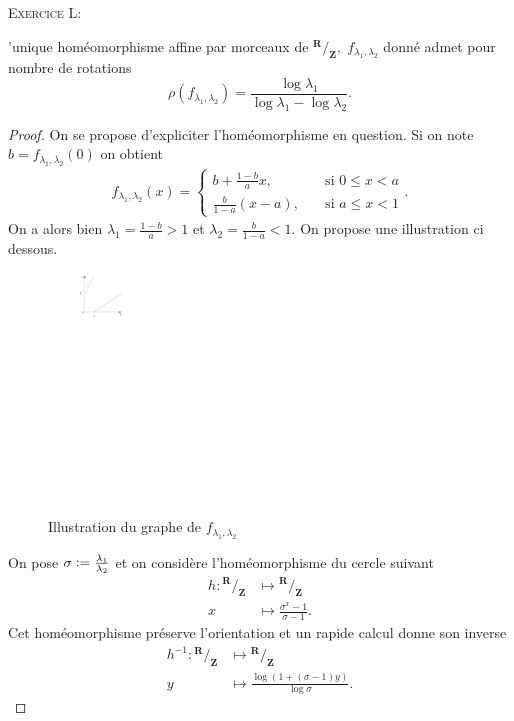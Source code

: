 \documentclass[12pt]{article}
\newcommand{\defeq}{\vcentcolon=}
\newenvironment{ex}[1]
{\begin{mdframed}[linewidth=0.6pt]
        \textsc{Exercice #1:}

}
    {\end{mdframed}}
\newcommand{\R}{\mathbf{R}}
\newcommand{\Z}{\mathbf{Z}}
\newcommand*\quot[2]{{^{\textstyle #1}\big/_{\textstyle #2}}}
\theoremstyle{remark}
\begin{document}
\newpage

\begin{ex}{2}
        L'unique homéomorphisme affine par morceaux de $\quot{\R}{\Z}, \; f_{\lambda_1, \lambda_2}$ donné admet pour nombre de rotations
        \[
                \rho(f_{\lambda_1, \lambda_2}) = \frac{\log\lambda_1} {\log\lambda_1 -\log\lambda_2}
        .\] 
\end{ex}
\begin{proof}
        On se propose d'expliciter l'homéomorphisme en question. Si on note $b = f_{\lambda_1, \lambda_2}(0)$ on obtient 
        \begin{align*}
                f_{\lambda_1, \lambda_2}(x) = \begin{cases}
                        b+ \frac{1-b}{a}x, \quad &\text{si } 0 \le x < a \\
                        \frac{b}{1-a}(x-a), \quad &\text{si } a \le x < 1
                \end{cases}
        .\end{align*}
        On a alors bien $\lambda_1 = \frac{1-b}{a} > 1$ et $\lambda_2 = \frac{b}{1-a} < 1$. On propose une illustration ci dessous. 
        \begin{figure}[htpb]
                \centering
                \includegraphics[width=0.4\textwidth]{homeo.pdf}
                \caption{Illustration du graphe de $f_{\lambda_1, \lambda_2}$}
                \label{fig:homeo-pdf}
        \end{figure}

        On pose $\sigma \defeq \frac{\lambda_1}{\lambda_2}$ et on considère l'homéomorphisme du cercle suivant
        \begin{align*}
                h : \quot{\R}{\Z} &\longmapsto \quot{\R}{\Z} \\
                x &\longmapsto \frac{\sigma^{x}-1}{\sigma-1} 
        .\end{align*}
        Cet homéomorphisme préserve l'orientation et un rapide calcul donne son inverse
        \begin{align*}
                h^{-1} : \quot{\R}{\Z} &\longmapsto \quot{\R}{\Z} \\
                y &\longmapsto \frac{\log(1+(\sigma -1)y)}{\log\sigma}
        .\end{align*}


\end{proof}
\end{document}
